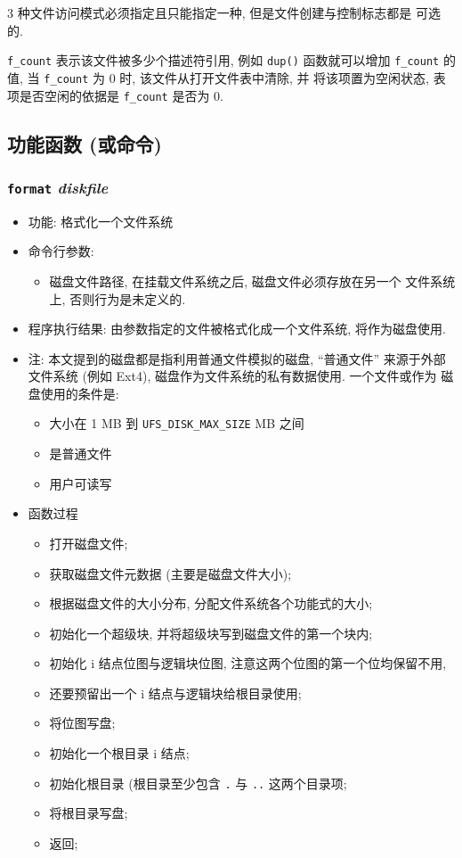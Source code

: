 \documentclass[nofonts]{ctexart}
\begin{document}
3 种文件访问模式必须指定且只能指定一种, 但是文件创建与控制标志都是
可选的.

\texttt{f\_count} 表示该文件被多少个描述符引用, 例如 \texttt{dup()}
函数就可以增加 \texttt{f\_count} 的值, 当 \texttt{f\_count} 为 0 时,
该文件从打开文件表中清除, 并 将该项置为空闲状态, 表项是否空闲的依据是
\texttt{f\_count} 是否为 0.

\subsection{功能函数
(或命令)}\label{ux529fux80fdux51fdux6570-ux6216ux547dux4ee4}

\subsubsection[\texttt{format}]{\texttt{format} \textit{diskfile}}
\begin{itemize}
\item
  功能: 格式化一个文件系统
\item
  命令行参数:

  \begin{itemize}
  \item
    磁盘文件路径, 在挂载文件系统之后, 磁盘文件必须存放在另一个
    文件系统上, 否则行为是未定义的.
  \end{itemize}
\item
  程序执行结果: 由参数指定的文件被格式化成一个文件系统, 将作为磁盘使用.
\item
  注: 本文提到的磁盘都是指利用普通文件模拟的磁盘, ``普通文件''
  来源于外部 文件系统 (例如 Ext4), 磁盘作为文件系统的私有数据使用.
  一个文件或作为 磁盘使用的条件是:

  \begin{itemize}
  \item
    大小在 1 MB 到 \texttt{UFS\_DISK\_MAX\_SIZE} MB 之间
  \item
    是普通文件
  \item
    用户可读写
  \end{itemize}
\item
  函数过程

  \begin{itemize}
  \item
    打开磁盘文件;
  \item
    获取磁盘文件元数据 (主要是磁盘文件大小);
  \item
    根据磁盘文件的大小分布, 分配文件系统各个功能式的大小;
  \item
    初始化一个超级块, 并将超级块写到磁盘文件的第一个块内;
  \item
    初始化 i 结点位图与逻辑块位图, 注意这两个位图的第一个位均保留不用,
  \item
    还要预留出一个 i 结点与逻辑块给根目录使用;
  \item
    将位图写盘;
  \item
    初始化一个根目录 i 结点;
  \item
    初始化根目录 (根目录至少包含 \texttt{.} 与 \texttt{..} 这两个目录项;
  \item
    将根目录写盘;
  \item
    返回;
  \end{itemize}
\end{itemize}
\end{document}

